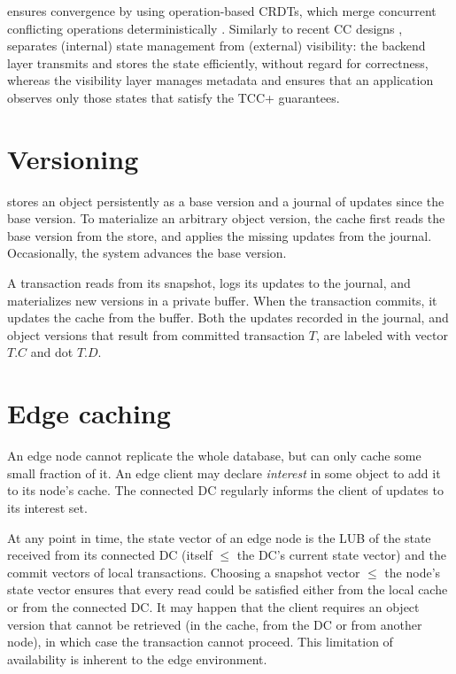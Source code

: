 
\system{} ensures convergence by using operation-based CRDTs, which
merge concurrent conflicting operations deterministically
\cite{syn:rep:sh143}.
Similarly to recent CC designs \cite{db:syn:1808, rep:pro:sh182},
\system{} separates (internal) state management from (external)
visibility: the backend layer transmits and stores the state efficiently,
without regard for correctness, whereas the visibility layer manages
metadata and ensures that an application observes only those states that
satisfy the TCC+ guarantees.

\section{Versioning}
\label{sec:versioning}

\system{} stores an object persistently as a base version and
a journal of updates since the base version.
To materialize an arbitrary object version, the cache first reads the
base version from the store, and applies the missing updates from the
journal.
Occasionally, the system advances the base version.

A transaction reads from its snapshot, logs its updates to the
journal, and materializes new versions in a private buffer.
When the transaction commits, it updates the cache from the buffer.
Both the updates recorded in the journal, and object versions that
result from committed transaction $T$, are labeled with vector $T.C$
and dot $T.D$.

\section{Edge caching}
\label{sec:edge-caching}

An edge node cannot replicate the whole database, but can only cache
some small fraction of it.
An edge client may declare \emph{interest} in some object to add it to
its node's cache.
The connected DC regularly informs the client of updates to its interest
set.

At any point in time, the state vector of an edge node is the LUB of the
state received from its connected DC (itself $\le$ the DC's current
state vector) and the commit vectors of local transactions.
Choosing a snapshot vector $\le$ the node's state vector ensures that
every read could be satisfied either from the local cache or from the
connected DC.
It may happen that the client requires an object version that cannot be
retrieved (in the cache, from the DC or from another node), in which case
the transaction cannot proceed.
This limitation of availability is inherent to the edge environment.
